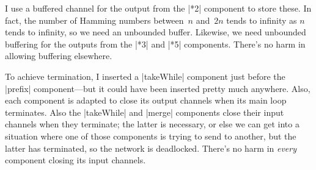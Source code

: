 \begin{answerI}
I use a buffered channel for the output from the |*2| component to store
these.  In fact, the number of Hamming numbers between~$n$ and~$2n$ tends to
infinity as $n$ tends to infinity, so we need an unbounded buffer.  Likewise,
we need unbounded buffering for the outputs from  the |*3| and |*5|
components.  There's no harm in allowing buffering elsewhere.  

To achieve termination, I inserted a |takeWhile| component just before the
|prefix| component---but it could have been inserted pretty much anywhere.
Also, each component is adapted to close its output channels when its main
loop terminates.  Also the |takeWhile| and |merge| components close their
input channels when they terminate; the latter is necessary, or else we can
get into a situation where one of those components is trying to send to
another, but the latter has terminated, so the network is deadlocked.  There's
no harm in \emph{every} component closing its input channels.
\end{answerI}
